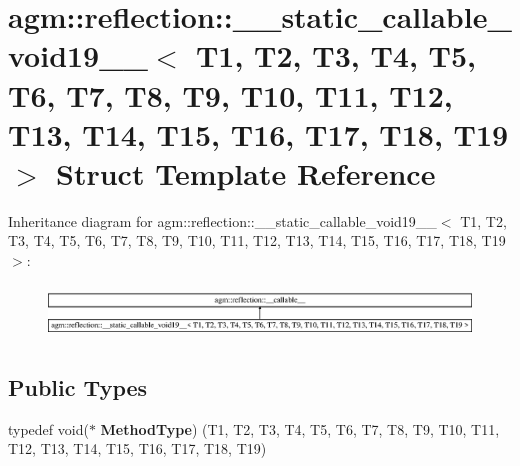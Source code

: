 \hypertarget{structagm_1_1reflection_1_1____static__callable__void19____}{}\section{agm\+:\+:reflection\+:\+:\+\_\+\+\_\+static\+\_\+callable\+\_\+void19\+\_\+\+\_\+$<$ T1, T2, T3, T4, T5, T6, T7, T8, T9, T10, T11, T12, T13, T14, T15, T16, T17, T18, T19 $>$ Struct Template Reference}
\label{structagm_1_1reflection_1_1____static__callable__void19____}
Inheritance diagram for agm\+:\+:reflection\+:\+:\+\_\+\+\_\+static\+\_\+callable\+\_\+void19\+\_\+\+\_\+$<$ T1, T2, T3, T4, T5, T6, T7, T8, T9, T10, T11, T12, T13, T14, T15, T16, T17, T18, T19 $>$\+:\begin{figure}[H]
\begin{center}
\leavevmode
\includegraphics[height=1.430396cm]{structagm_1_1reflection_1_1____static__callable__void19____}
\end{center}
\end{figure}
\subsection*{Public Types}
\begin{DoxyCompactItemize}
\item 
typedef void($\ast$ {\bfseries Method\+Type}) (T1, T2, T3, T4, T5, T6, T7, T8, T9, T10, T11, T12, T13, T14, T15, T16, T17, T18, T19)\hypertarget{structagm_1_1reflection_1_1____static__callable__void19_____a8a65929979f904826ebbc70621f9e19e}{}\label{structagm_1_1reflection_1_1____static__callable__void19_____a8a65929979f904826ebbc70621f9e19e}

\end{DoxyCompactItemize}
